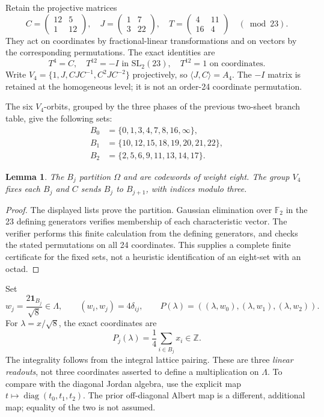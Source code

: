\documentclass[11pt,reqno]{amsart}
\newtheorem{lemma}[theorem]{Lemma}
\theoremstyle{definition}\newtheorem{definition}[theorem]{Definition}
\theoremstyle{remark}\newtheorem{remark}[theorem]{Remark}
\newcommand{\Z}{\mathbb Z}\newcommand{\Q}{\mathbb Q}\newcommand{\R}{\mathbb R}\newcommand{\F}{\mathbb F}
\newcommand{\La}{\Lambda}\newcommand{\tr}{\operatorname{tr}}\newcommand{\Span}{\operatorname{span}}
\begin{document}
Retain the projective matrices
\[
C=\begin{pmatrix}12&5\\1&12\end{pmatrix},\quad
J=\begin{pmatrix}1&7\\3&22\end{pmatrix},\quad
T=\begin{pmatrix}4&11\\16&4\end{pmatrix}\quad(\bmod23).
\]
They act on coordinates by fractional-linear transformations and on vectors by the corresponding permutations. The exact identities are
\[
T^4=C,\quad T^{12}=-I\text{ in }\mathrm{SL}_2(23),\quad T^{12}=1\text{ on coordinates}.
\]
Write $V_4=\{1,J,CJC^{-1},C^2JC^{-2}\}$ projectively, so $\langle J,C\rangle=A_4$. The $-I$ matrix is retained at the homogeneous level; it is not an order-24 coordinate permutation.

The six $V_4$-orbits, grouped by the three phases of the previous two-sheet branch table, give the following sets:
\begin{align*}
B_0&=\{0,1,3,4,7,8,16,\infty\},\\
B_1&=\{10,12,15,18,19,20,21,22\},\\
B_2&=\{2,5,6,9,11,13,14,17\}.
\end{align*}
\begin{lemma}\label{lem:octads}
The $B_j$ partition $\Omega$ and are codewords of weight eight. The group $V_4$ fixes each $B_j$ and $C$ sends $B_j$ to $B_{j+1}$, with indices modulo three.
\end{lemma}
\begin{proof}
The displayed lists prove the partition. Gaussian elimination over $\F_2$ in the 23 defining generators verifies membership of each characteristic vector. The verifier performs this finite calculation from the defining generators, and checks the stated permutations on all 24 coordinates. This supplies a complete finite certificate for the fixed sets, not a heuristic identification of an eight-set with an octad.
\end{proof}
Set
\begin{equation}\label{eq:frame}
w_j=\frac{2\mathbf1_{B_j}}{\sqrt8}\in\La,\qquad
(w_i,w_j)=4\delta_{ij},\qquad
P(\lambda)=((\lambda,w_0),(\lambda,w_1),(\lambda,w_2)).
\end{equation}
For $\lambda=x/\sqrt8$, the exact coordinates are
\[
P_j(\lambda)=\frac14\sum_{i\in B_j}x_i\in\Z.
\]
The integrality follows from the integral lattice pairing. These are three \emph{linear readouts}, not three coordinates asserted to define a multiplication on $\La$. To compare with the diagonal Jordan algebra, use the explicit map $t\mapsto\operatorname{diag}(t_0,t_1,t_2)$. The prior off-diagonal Albert map is a different, additional map; equality of the two is not assumed.
\end{document}
